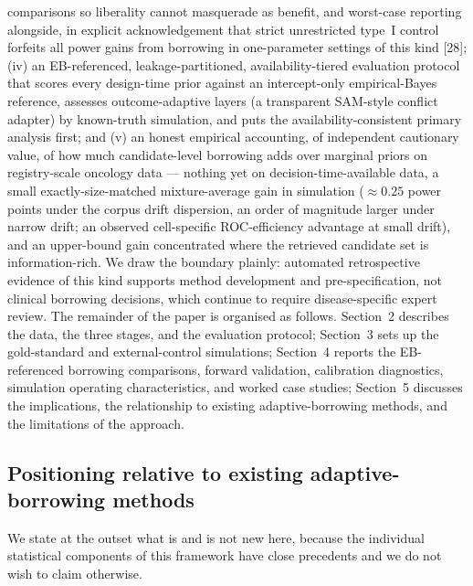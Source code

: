 \documentclass[11pt]{article}
\begin{document}
comparisons so liberality cannot masquerade as benefit, and worst-case
reporting alongside, in explicit acknowledgement that strict unrestricted
type~I control forfeits all power gains from borrowing in one-parameter
settings of this kind [28];
(iv) an EB-referenced, leakage-partitioned, availability-tiered evaluation
protocol that scores every design-time prior against an intercept-only
empirical-Bayes reference, assesses outcome-adaptive layers (a transparent
SAM-style conflict adapter) by known-truth simulation, and puts the
availability-consistent primary analysis first; and
(v) an honest empirical accounting, of independent cautionary value, of how
much candidate-level borrowing adds over marginal priors on registry-scale
oncology data --- nothing yet on decision-time-available data, a small
exactly-size-matched mixture-average gain in simulation ($\approx 0.25$
power points under the corpus drift dispersion, an order of magnitude
larger under narrow drift; an observed cell-specific ROC-efficiency
advantage at small drift), and an upper-bound gain
concentrated where the
retrieved candidate set is information-rich. We draw the
boundary plainly: automated retrospective evidence of this kind supports method
development and pre-specification, not clinical borrowing decisions, which
continue to require disease-specific expert review. The remainder of the paper
is organised as follows. Section~2 describes the data, the three stages, and
the evaluation protocol; Section~3 sets up the gold-standard and
external-control simulations; Section~4 reports the EB-referenced borrowing
comparisons, forward validation, calibration diagnostics, simulation operating
characteristics, and worked case studies; Section~5 discusses the
implications, the relationship to existing adaptive-borrowing methods, and the
limitations of the approach.


\subsection*{Positioning relative to existing adaptive-borrowing methods}

We state at the outset what is and is not new here, because the individual
statistical components of this framework have close precedents and we do not
wish to claim otherwise.
\end{document}
